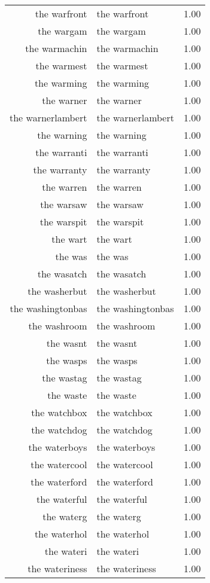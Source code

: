 \begin{table}[ht]
\begin{tabular}{rlr}
  the warfront & the warfront & 1.00 \\ 
  the wargam & the wargam & 1.00 \\ 
  the warmachin & the warmachin & 1.00 \\ 
  the warmest & the warmest & 1.00 \\ 
  the warming & the warming & 1.00 \\ 
  the warner & the warner & 1.00 \\ 
  the warnerlambert & the warnerlambert & 1.00 \\ 
  the warning & the warning & 1.00 \\ 
  the warranti & the warranti & 1.00 \\ 
  the warranty & the warranty & 1.00 \\ 
  the warren & the warren & 1.00 \\ 
  the warsaw & the warsaw & 1.00 \\ 
  the warspit & the warspit & 1.00 \\ 
  the wart & the wart & 1.00 \\ 
  the was & the was & 1.00 \\ 
  the wasatch & the wasatch & 1.00 \\ 
  the washerbut & the washerbut & 1.00 \\ 
  the washingtonbas & the washingtonbas & 1.00 \\ 
  the washroom & the washroom & 1.00 \\ 
  the wasnt & the wasnt & 1.00 \\ 
  the wasps & the wasps & 1.00 \\ 
  the wastag & the wastag & 1.00 \\ 
  the waste & the waste & 1.00 \\ 
  the watchbox & the watchbox & 1.00 \\ 
  the watchdog & the watchdog & 1.00 \\ 
  the waterboys & the waterboys & 1.00 \\ 
  the watercool & the watercool & 1.00 \\ 
  the waterford & the waterford & 1.00 \\ 
  the waterful & the waterful & 1.00 \\ 
  the waterg & the waterg & 1.00 \\ 
  the waterhol & the waterhol & 1.00 \\ 
  the wateri & the wateri & 1.00 \\ 
  the wateriness & the wateriness & 1.00 \\ 

\end{tabular}
\end{table}
